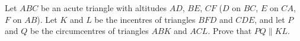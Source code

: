 Let $ABC$ be an acute triangle with altitudes $AD$, $BE$, $CF$ ($D$ on $BC$, $E$ on $CA$, $F$ on $AB$). Let $K$ and $L$ be the incentres of triangles $BFD$ and $CDE$, and let $P$ and $Q$ be the circumcentres of triangles $ABK$ and $ACL$. Prove that $PQ\parallel KL$.

